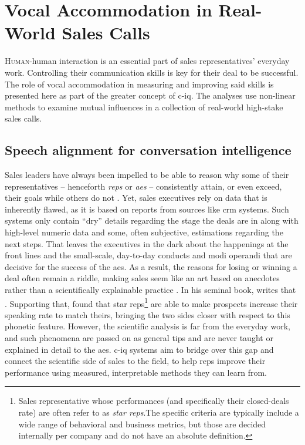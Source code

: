 \chapter{Vocal Accommodation in Real-World Sales Calls}
\label{chap:conv_analysis}

\lettrine{H}{uman}-human interaction is an essential part of sales representatives' everyday work.
Controlling their communication skills is key for their deal to be successful.
The role of vocal accommodation in measuring and improving said skills is presented here as part of the greater concept of \acl{c-iq}.
The analyses use non-linear methods to examine mutual influences in a collection of real-world high-stake sales calls.

\pagebreak

\section{Speech alignment for conversation intelligence}
\label{sec:conversation_intelligence}

Sales leaders have always been impelled to be able to reason why some of their representatives -- henceforth \emph{reps} or \emph{\acp{ae}} -- consistently attain, or even exceed, their goals while others do not \citep[see overview in][]{Kovac2017its}.
Yet, sales executives rely on data that is inherently flawed, as it is based on reports from sources like \ac{crm} systems.
Such systems only contain \enquote{dry} details regarding the stage the deals are in along with high-level numeric data and some, often subjective, estimations regarding the next steps.
That leaves the executives in the dark about the happenings at the front lines and the small-scale, day-to-day conducts and modi operandi that are decisive for the success of the \acp{ae}.
As a result, the reasons for losing or winning a deal often remain a riddle, making sales seem like an art based on anecdotes rather than a scientifically explainable practice \citep{Yohn2016best, Martin2017six}.
In his seminal book, \citet{Gladwell2006tipping} writes that .
Supporting that, \citet{Orlob2018nine} found that star reps\footnote{Sales representative whose performances (and specifically their closed-deals rate) are often refer to as \emph{star reps}.The specific criteria are typically include a wide range of behavioral and business metrics, but those are decided internally per company and do not have an absolute definition.} are able to make prospects increase their speaking rate to match theirs, bringing the two sides closer with respect to this phonetic feature.
However, the scientific analysis is far from the everyday work, and such phenomena are passed on as general tips and are never taught or explained in detail to the \acp{ae}.
\Ac{c-iq} systems aim to bridge over this gap and connect the scientific side of sales to the field, to help reps improve their performance using measured, interpretable methods they can learn from.

